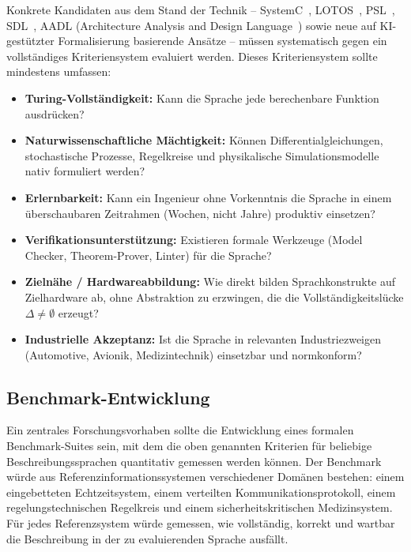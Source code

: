 ﻿\documentclass[a4paper,12pt]{report}
\theoremstyle{definition}
\begin{document}
Konkrete Kandidaten aus dem Stand der Technik -- SystemC~\cite{systemc2012},
LOTOS~\cite{lotos1988}, PSL~\cite{psl2005}, SDL~\cite{sdl2000}, AADL (Architecture
Analysis and Design Language~\cite{aadl2004}) sowie neue auf KI-gestützter
Formalisierung basierende Ansätze -- müssen systematisch gegen ein vollständiges
Kriteriensystem evaluiert werden. Dieses Kriteriensystem sollte mindestens umfassen:

\begin{itemize}
  \item \textbf{Turing-Vollständigkeit:} Kann die Sprache jede berechenbare Funktion ausdrücken?
  \item \textbf{Naturwissenschaftliche Mächtigkeit:} Können Differentialgleichungen,
        stochastische Prozesse, Regelkreise und physikalische Simulationsmodelle nativ
        formuliert werden?
  \item \textbf{Erlernbarkeit:} Kann ein Ingenieur ohne Vorkenntnis die Sprache in einem
        überschaubaren Zeitrahmen (Wochen, nicht Jahre) produktiv einsetzen?
  \item \textbf{Verifikationsunterstützung:} Existieren formale Werkzeuge
        (Model Checker, Theorem-Prover, Linter) für die Sprache?
  \item \textbf{Zielnähe / Hardwareabbildung:} Wie direkt bilden Sprachkonstrukte
        auf Zielhardware ab, ohne Abstraktion zu erzwingen, die die Vollständigkeitslücke
        $\Delta \neq \emptyset$ erzeugt?
  \item \textbf{Industrielle Akzeptanz:} Ist die Sprache in relevanten Industriezweigen
        (Automotive, Avionik, Medizintechnik) einsetzbar und normkonform?
\end{itemize}

\subsection{Benchmark-Entwicklung}

Ein zentrales Forschungsvorhaben sollte die Entwicklung eines formalen Benchmark-Suites
sein, mit dem die oben genannten Kriterien für beliebige Beschreibungssprachen quantitativ
gemessen werden können. Der Benchmark würde aus Referenzinformationssystemen verschiedener
Domänen bestehen: einem eingebetteten Echtzeitsystem, einem verteilten Kommunikationsprotokoll,
einem regelungstechnischen Regelkreis und einem sicherheitskritischen Medizinsystem.
Für jedes Referenzsystem würde gemessen, wie vollständig, korrekt und wartbar die Beschreibung
in der zu evaluierenden Sprache ausfällt.
\end{document}
